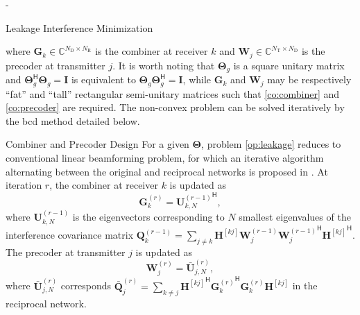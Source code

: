 \begin{section}{-}
\begin{subsection}{Leakage Interference Minimization}
\begin{mini!}
		\end{mini!}
		where $\mathbf{G}_k \in \mathbb{C}^{N_\mathrm{D} \times N_\mathrm{R}}$ is the combiner at receiver $k$ and $\mathbf{W}_j \in \mathbb{C}^{N_\mathrm{T} \times N_\mathrm{D}}$ is the precoder at transmitter $j$.
		It is worth noting that $\mathbf{\Theta}_g$ is a square unitary matrix and $\mathbf{\Theta}_g^\mathsf{H} \mathbf{\Theta}_g=\mathbf{I}$ is equivalent to $\mathbf{\Theta}_g \mathbf{\Theta}_g^\mathsf{H}=\mathbf{I}$, while $\mathbf{G}_k$ and $\mathbf{W}_j$ may be respectively ``fat'' and ``tall'' rectangular semi-unitary matrices such that \eqref{co:combiner} and \eqref{co:precoder} are required.
		The non-convex problem can be solved iteratively by the \gls{bcd} method detailed below.

		\begin{subsubsection}{Combiner and Precoder Design}
			For a given $\mathbf{\Theta}$, problem \eqref{op:leakage} reduces to conventional linear beamforming problem, for which an iterative algorithm alternating between the original and reciprocal networks is proposed in \cite{Gomadam2011,Clerckx2013}.
			At iteration $r$, the combiner at receiver $k$ is updated as
			\begin{equation}
				\mathbf{G}_k^{(r)} = {\mathbf{U}_{k,N}^{(r-1)}}^\mathsf{H},
				\label{eq:combiner_leakage}
			\end{equation}
			where $\mathbf{U}_{k,N}^{(r-1)}$ is the eigenvectors corresponding to $N$ smallest eigenvalues of the interference covariance matrix $\mathbf{Q}_k^{(r-1)} = \sum_{j \ne k} {\mathbf{H}^{[kj]}} \mathbf{W}_j^{(r-1)} {\mathbf{W}_j^{(r-1)}}^\mathsf{H} {\mathbf{H}^{[kj]}}^\mathsf{H}$.
			The precoder at transmitter $j$ is updated as
			\begin{equation}
				\mathbf{W}_j^{(r)} = \bar{\mathbf{U}}_{j,N}^{(r)},
				\label{eq:precoder_leakage}
			\end{equation}
			where $\bar{\mathbf{U}}_{j,N}^{(r)}$ corresponds $\bar{\mathbf{Q}}_j^{(r)} = \sum_{k \ne j} {\mathbf{H}^{[kj]}}^\mathsf{H} {\mathbf{G}_k^{(r)}}^\mathsf{H} \mathbf{G}_k^{(r)} {\mathbf{H}^{[kj]}}$ in the reciprocal network.
		\end{subsubsection}


\end{subsection}
\end{section}
